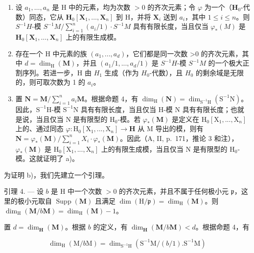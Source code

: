 \begin{enumerate}
\def\labelenumi{\alph{enumi})}
\item
  设 \(a_1, \ldots, a_n\) 是 H 中的元素，均为次数 \(> 0\) 的齐次元素；令 \(\varphi\) 为一个（\(\mathbf{H}_0\)-代数）同态，它从 \(\mathbf{H}_0[\mathbf{X}_1, \ldots, \mathbf{X}_n]\) 到 H，并将 \(\mathbf{X}_i\) 送到 \(a_i\)，其中 \(1 \leqslant i \leqslant n\)。则 \(S^{-1}H\)-模 \(S^{-1}M / \sum_{i=1}^{n}(a_i/1) \cdot S^{-1}M\) 具有有限长度，当且仅当 \(\varphi_*(M)\) 是 \(\mathbf{H}_0[\mathbf{X}_1, \ldots, \mathbf{X}_n]\) 上的有限生成模。
\item
  存在一个 H 中元素的族 \((a_{1},...,a_{d})\)，它们都是同一次数 \textgreater0 的齐次元素，其中 \(d=\dim_{\mathrm{H}}(\mathbf{M})\)，并且 \((a_{1}/1,...,a_{d}/1)\) 是 \(S^{-1}H\)-模 \(S^{-1}M\) 的一个极大正割序列。若进一步，H 由 \(H_{1}\) 生成（作为 \(H_{0}\)-代数），且 \(H_{0}\) 的剩余域是无限的，则可取次数为 1 的 \(a_{i}\)。
\item
  置 \(\mathbf{N} = \mathbf{M} / \sum_{i=1}^{n} a_i \mathbf{M}\)。根据命题 4，有 \(\dim_{\mathrm{H}}(\mathbf{N}) = \dim_{\mathrm{S}^{-1}\mathrm{H}}(\mathrm{S}^{-1}\mathrm{N})\)。因此，\(\mathrm{S}^{-1}\mathrm{H}\)-模 \(\mathrm{S}^{-1}\mathrm{N}\) 具有有限长度，当且仅当 H-模 N 具有有限长度；也就是说，当且仅当 N 是有限型的 \(\mathrm{H}_0\)-模。若 \(\varphi_*(\mathbf{M})\) 是定义在 \(\mathrm{H}_0[\mathrm{X}_1, ..., \mathrm{X}_n]\) 上的、通过同态 \(\varphi : \mathrm{H}_0[\mathrm{X}_1, ..., \mathrm{X}_n] \to \mathbf{H}\) 从 M 导出的模，则有 \(\mathbf{N} = \varphi_*(\mathbf{M}) / \sum_{i=1}^{n} X_i \cdot \varphi_*(\mathbf{M})\)。因此（A, II, p.~171，推论 3 和注），\(\varphi_*(\mathbf{M})\) 是 \(\mathrm{H}_0[\mathrm{X}_1, ..., \mathrm{X}_n]\) 上的有限生成模，当且仅当 N 是有限型的 \(\mathrm{H}_0\)-模。这就证明了 a)。
\end{enumerate}

为证明 b)，我们先建立一个引理。

引理 4. --- 设 \(b\) 是 H 中一个次数 \(>0\) 的齐次元素，并且不属于任何极小元 \(\mathfrak{p}\)，这里的极小元取自 \(\operatorname{Supp}(\mathbf{M})\) 且满足 \(\dim(\mathrm{H}/\mathfrak{p}) = \dim_{\mathrm{H}}(\mathbf{M})\)。则 \(\dim_{\mathrm{H}}(\mathbf{M}/b\mathbf{M}) = \dim_{\mathrm{H}}(\mathbf{M}) - 1\)。

置 \(d = \dim_{\mathbf{H}}(\mathbf{M})\)。根据 \(b\) 的定义，有 \(\dim_{\mathbf{H}}(\mathbf{M}/b\mathbf{M}) < d\)。根据命题 4，有

\[
\dim_ {\mathrm{H}} (\mathrm{M} / b \mathrm{M}) = \dim_ {\mathrm{S} ^ {- 1} \mathrm{H}} \left(\mathrm{S} ^ {- 1} \mathrm{M} / (b / 1). \mathrm{S} ^ {- 1} \mathrm{M}\right)
\]

